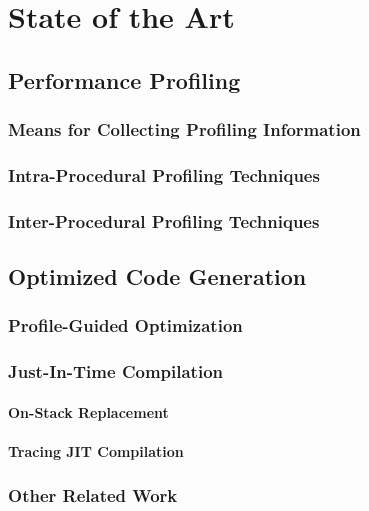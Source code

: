 \chapter{State of the Art}

\section{Performance Profiling}

\subsection{Means for Collecting Profiling Information}

\subsection{Intra-Procedural Profiling Techniques}

\subsection{Inter-Procedural Profiling Techniques}

\section{Optimized Code Generation}

\subsection{Profile-Guided Optimization}

\subsection{Just-In-Time Compilation}

\subsubsection{On-Stack Replacement}

\subsubsection{Tracing JIT Compilation}

\subsection{Other Related Work}

